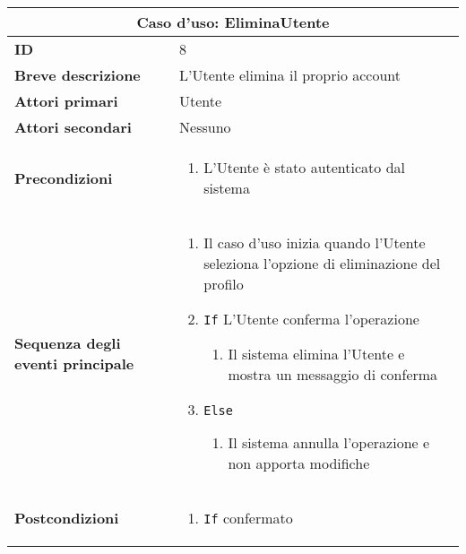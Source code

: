 \documentclass[a4paper]{report}
\begin{document}
\clearpage
\begin{table}[H]
\vspace*{-0cm}
\renewcommand{\arraystretch}{1.9}
\begin{tabular}{|p{3.9cm}|p{9.9cm}|}
\hline
\multicolumn{2}{|c|}{\textbf{Caso d’uso: EliminaUtente}} \\ \hline
\textbf{ID} & 8 \\ \hline
\textbf{Breve descrizione} &  L’Utente elimina il proprio account \\ \hline
\textbf{Attori primari} & Utente \\ \hline
\textbf{Attori secondari} & Nessuno \\ \hline
\textbf{Precondizioni} & \begin{enumerate}[leftmargin=14pt,label=\arabic*.,labelsep=0.5em,topsep=0pt,partopsep=0pt,parsep=0pt,itemsep=0pt]
    \item L’Utente è stato autenticato dal sistema
\end{enumerate} \\ \hline
\textbf{Sequenza degli eventi principale} &
\begin{enumerate}[leftmargin=14pt,label=\arabic*.,labelsep=0.5em,topsep=0pt,partopsep=0pt,parsep=0pt,itemsep=0pt]
    \item Il caso d'uso inizia quando l’Utente seleziona l'opzione di eliminazione del profilo
    \item \texttt{If} L’Utente conferma l’operazione
    \begin{enumerate}[label=\arabic{enumi}.\arabic*.,leftmargin=22pt,labelsep=0.5em,topsep=0pt,partopsep=0pt,parsep=0pt,itemsep=0pt]
        \item Il sistema elimina l’Utente e mostra un messaggio di conferma
    \end{enumerate}
    \item \texttt{Else}
    \begin{enumerate}[label=\arabic{enumi}.\arabic*.,leftmargin=22pt,labelsep=0.5em,topsep=0pt,partopsep=0pt,parsep=0pt,itemsep=0pt]
        \item Il sistema annulla l’operazione e non apporta modifiche
    \end{enumerate}
\end{enumerate}\\ \hline
\textbf{Postcondizioni} & \begin{enumerate}[leftmargin=14pt,label=\arabic*.,labelsep=0.5em,topsep=0pt,partopsep=0pt,parsep=0pt,itemsep=0pt]
    \item \texttt{If} confermato

\end{enumerate}
\end{tabular}
\end{table}
\end{document}
